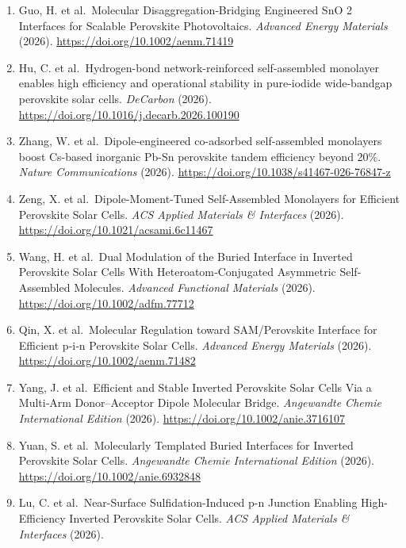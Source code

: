 \documentclass[
  11pt,
]{article}
\begin{document}
\begin{enumerate}
  Zha, L. et al.~A Buried Sulfonate Molecular Bridge for Synchronous
  Charge Transport and Defect Passivation in High-Performance Perovskite
  Solar Cells. \emph{Nano-Micro Letters} (2026).
  \url{https://doi.org/10.1007/s40820-026-02278-6}
\item
  Guo, H. et al.~Molecular Disaggregation‐Bridging Engineered SnO 2
  Interfaces for Scalable Perovskite Photovoltaics. \emph{Advanced
  Energy Materials} (2026). \url{https://doi.org/10.1002/aenm.71419}
\item
  Hu, C. et al.~Hydrogen-bond network-reinforced self-assembled
  monolayer enables high efficiency and operational stability in
  pure-iodide wide-bandgap perovskite solar cells. \emph{DeCarbon}
  (2026). \url{https://doi.org/10.1016/j.decarb.2026.100190}
\item
  Zhang, W. et al.~Dipole-engineered co-adsorbed self-assembled
  monolayers boost Cs-based inorganic Pb-Sn perovskite tandem efficiency
  beyond 20\%. \emph{Nature Communications} (2026).
  \url{https://doi.org/10.1038/s41467-026-76847-z}
\item
  Zeng, X. et al.~Dipole-Moment-Tuned Self-Assembled Monolayers for
  Efficient Perovskite Solar Cells. \emph{ACS Applied Materials \&
  Interfaces} (2026). \url{https://doi.org/10.1021/acsami.6c11467}
\item
  Wang, H. et al.~Dual Modulation of the Buried Interface in Inverted
  Perovskite Solar Cells With Heteroatom‐Conjugated Asymmetric
  Self‐Assembled Molecules. \emph{Advanced Functional Materials} (2026).
  \url{https://doi.org/10.1002/adfm.77712}
\item
  Qin, X. et al.~Molecular Regulation toward SAM/Perovskite Interface
  for Efficient p‐i‐n Perovskite Solar Cells. \emph{Advanced Energy
  Materials} (2026). \url{https://doi.org/10.1002/aenm.71482}
\item
  Yang, J. et al.~Efficient and Stable Inverted Perovskite Solar Cells
  Via a Multi‐Arm Donor--Acceptor Dipole Molecular Bridge.
  \emph{Angewandte Chemie International Edition} (2026).
  \url{https://doi.org/10.1002/anie.3716107}
\item
  Yuan, S. et al.~Molecularly Templated Buried Interfaces for Inverted
  Perovskite Solar Cells. \emph{Angewandte Chemie International Edition}
  (2026). \url{https://doi.org/10.1002/anie.6932848}
\item
  Lu, C. et al.~Near-Surface Sulfidation-Induced p-n Junction Enabling
  High-Efficiency Inverted Perovskite Solar Cells. \emph{ACS Applied
  Materials \& Interfaces} (2026).

\end{enumerate}
\end{document}
